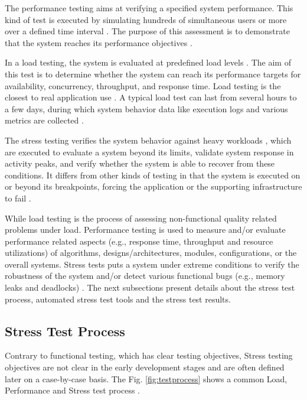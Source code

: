 \documentclass[times]{stvrauth}
\begin{document}
The performance testing aims at verifying a specified system performance. This kind of test is executed by simulating hundreds of simultaneous users or more over a defined time interval \cite{DiLucca2006}. The purpose of this assessment is to demonstrate that the system reaches its performance objectives \cite{Sandler2004}. 


In a load testing, the system is evaluated at predefined load levels \cite{DiLucca2006}. The aim of this test is to determine whether the system can reach its performance targets for availability, concurrency, throughput, and response time. Load testing is the closest to real application use \cite{Molyneaux2009}. A typical load test can last from several hours to a few days, during which system behavior data like execution logs and various metrics are collected \cite{Afzal2009a}. 

The stress testing verifies the system behavior against heavy workloads \cite{Sandler2004}, which are executed to evaluate a system beyond its limits, validate system response in activity peaks, and verify whether the system is able to recover from these conditions. It differs from other kinds of testing in that the system is executed on or beyond its breakpoints, forcing the application or the supporting infrastructure to fail \cite{DiLucca2006} \cite{Molyneaux2009}.


While load testing is the process of assessing non-functional quality related problems under load. Performance testing is used to measure and/or evaluate performance
related aspects (e.g., response time, throughput and resource utilizations) of algorithms, designs/architectures, modules, configurations, or the overall systems. Stress tests puts a system under extreme conditions to verify the robustness of the system and/or detect various functional bugs (e.g., memory leaks and deadlocks) \cite{Afzal2009a}. The next subsections present details about the stress test process, automated stress test tools and the stress test results.

\subsection{Stress Test Process}

Contrary to functional testing, which has clear testing objectives, Stress testing objectives are not clear in the early development stages and are often defined later on a case-by-case basis. The Fig. \ref{fig:testprocess} shows a common Load, Performance and Stress test process  \cite{Jiang2010}.
\end{document}
